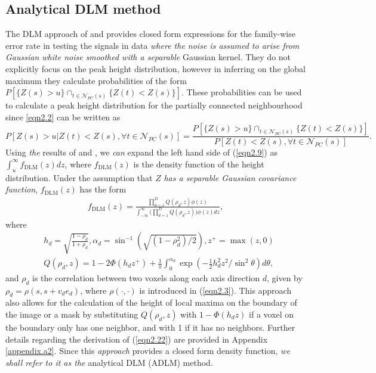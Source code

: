 \documentclass{article}
\newcommand{\nt}[1]{\textit{\color{red} #1}}
\begin{document}
\subsection{Analytical DLM method} 
\label{sec2.1}
The DLM approach of \cite{worsley2005improved} and \cite{taylor2007maxima} provides closed form expressions for the family-wise error rate in testing the signals in data \nt{where the noise is assumed to arise from Gaussian white noise smoothed with a separable} Gaussian kernel. They do not explicitly focus on the peak height distribution, however in inferring on the global maximum they calculate probabilities of the form $ P\left[\{Z(s) > u\}\cap_{t\in\mathcal{N}_{PC}(s)}\{Z(t) < Z(s)\}\right] $. These probabilities can be used to calculate a peak height distribution for the partially connected neighbourhood since \eqref{eqn2.2} can be written as
\begin{equation}
P [Z(s) > u|Z(t) < Z(s), \forall t \in \mathcal{N}_{PC}(s)] = \frac{P\left[\{Z(s) > u\}\cap_{t\in\mathcal{N}_{PC}(s)}\{Z(t) < Z(s)\}\right]}{P[Z(t) < Z(s), \forall t \in \mathcal{N}_{PC}(s)]}. \label{eqn2.9}
\end{equation}
Using \nt{the} results of \cite{worsley2005improved} and \cite{taylor2007maxima}, we \nt{can} expand the left hand side of (\ref{eqn2.9}) as $\int_u^{\infty} f_{\text{DLM}}(z) dz$, where $f_{\text{DLM}}(z)$ is the density function of the height distribution. Under the assumption that $Z$ \nt{has a separable Gaussian covariance function}, $f_{\text{DLM}}(z)$ has the form
\begin{align}
f_{\text{DLM}}(z) = \frac{\prod_{d=1}^DQ(\rho_d,z)\phi(z)}{\int_{-\infty}^\infty\bigg(\prod_{d=1}^DQ(\rho_d,z)\bigg)\phi(z)dz} \label{eqn2.22},
\end{align}
where
\begin{align*}
&h_d = \sqrt{\frac{1-\rho_d}{1+\rho_d}}, \alpha_d = \sin^{-1}\left(\sqrt{(1-\rho_d^2)/2}\right), z^+ = \max(z,0) \nonumber\\
&Q(\rho_d, z) = 1 - 2\Phi(h_dz^+) + \frac{1}{\pi}\int_{0}^{\alpha_d}\exp\left(-\frac{1}{2}h^2_dz^2/\sin^2\theta\right)d\theta, 
\end{align*}
and $\rho_d$ is the correlation between two voxels along each axis direction $d$, given by $\rho_d = \rho(s, s+v_de_d)$, where $\rho(\cdot,\cdot)$ is introduced in (\ref{eqn2.3}).  This approach also allows for the calculation of the height of local maxima on the boundary of the image or a mask by substituting $Q(\rho_d, z)$ with $1-\Phi(h_dz)$ if a voxel on the boundary only has one neighbor, and with 1 if it has no neighbors. Further details regarding the derivation of (\ref{eqn2.22}) are provided in Appendix \ref{appendix.a2}. Since this \nt{approach} provides a closed form density function, \nt{we shall refer to it as the} analytical DLM (ADLM) method.  
\end{document}
